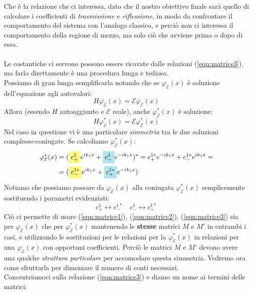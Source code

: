 \documentclass[../../FisicaTeorica.tex]{subfiles}
\begin{document}
Che è la relazione che ci interessa, dato che il nostro obiettivo finale sarà quello di calcolare i coefficienti di \textit{trasmissione} e \textit{riflessione}, in modo da confrontare il comportamento del sistema con l'analogo classico, e perciò non ci interessa il comportamento della regione di mezzo, ma solo ciò che avviene prima o dopo di essa.\\
\\
Le costantiche ci servono possono essere ricavate dalle relazioni (\ref{eqn:matrice3}), ma farlo direttamente è una procedura lunga e tediosa.\\
Possiamo di gran lunga semplificarla notando che se $\varphi_\mathcal{E}(x)$ è soluzione dell'equazione agli autovalori:
\[
H\varphi_\mathcal{E}(x)=\mathcal{E}\varphi_\mathcal{E}(x)
\]
Allora (essendo $H$ autoaggiunto e $\mathcal{E}$ reale), anche $\varphi_\mathcal{E}^*(x)$ è soluzione:
\[
H\varphi_\mathcal{E}^*(x)=\mathcal{E}\varphi_\mathcal{E}^*(x)
\]
Nel caso in questione vi è una particolare \textit{simmetria} tra le due soluzioni complesse-coniugate. Se calcoliamo $\varphi_\mathcal{E}^*(x)$:
\begin{align*}
\varphi_\mathcal{E}^*(x)&= (\hlc{Yellow}{c^1_+} e^{ik_1 x} + \hlc{SkyBlue}{c_-^1 }e^{-ik_1x})^* = c^{1*}_+ e^{-ik_1x}+c^{1*}_- e^{ik_1x} =\\
&= (\hlc{Yellow}{c^{1*}_-} e^{ik_1x}+\hlc{SkyBlue}{c^{1*}_+} e^{-ik_1 x})
\end{align*} 
Notiamo che possiamo passare da $\varphi_\mathcal{E}(x)$ alla coniugata $\varphi_\mathcal{E}^*(x)$ semplicemente sostituendo i parametri evidenziati:
\begin{equation}
c^1_+ \leftrightarrow c^{1*}_- \quad c^1_- \leftrightarrow c^{1*}_+
\label{eqn:sostituzioni_coniugate}
\end{equation}
Ciò ci permette di usare (\ref{eqn:matrice1}), (\ref{eqn:matrice2}), (\ref{eqn:matrice3})  sia per $\varphi_\mathcal{E}(x)$ che per $\varphi_\mathcal{E}^*(x)$ mantenendo le \textbf{stesse}  matrici $M$ e $M'$ in entrambi i casi, e utilizzando le sostituzioni per  le relazioni per la $\varphi_\mathcal{E}^*(x)$ in relazioni per una $\varphi_\mathcal{E}(x)$ con opportuni coefficienti. Perciò le matrici $M$ e $M'$  devono avere una qualche \textit{struttura particolare} per accomodare questa simmetria. Vedremo ora come sfruttarla per dimezzare il numero di conti necessari.\\ %
Concentriamoci sulla relazione (\ref{eqn:matrice3}) e diamo un nome ai termini delle matrici:
\end{document}
